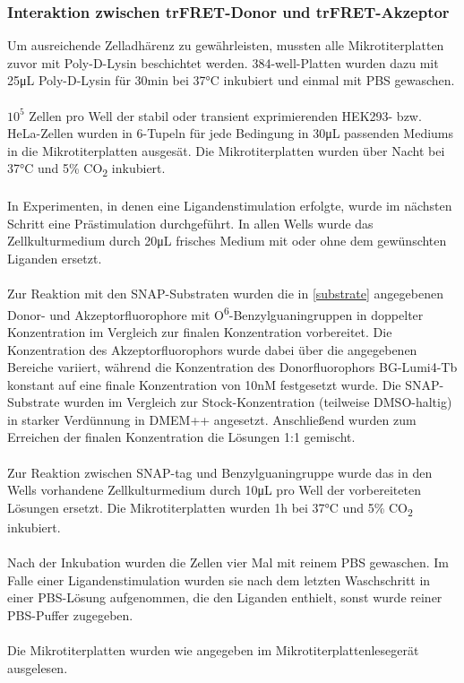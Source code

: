 \subsubsection{Interaktion zwischen trFRET-Donor und trFRET-Akzeptor}\label{interaktion}

Um ausreichende Zelladhärenz zu gewährleisten, mussten alle Mikrotiterplatten zuvor mit Poly-D-Lysin beschichtet werden. 384-well-Platten wurden dazu mit 25\si{\micro\liter} Poly-D-Lysin für 30\si{\minute} bei 37\si{\celsius} inkubiert und einmal mit PBS gewaschen.
\\ \\
$10^5$ Zellen pro Well der stabil oder transient exprimierenden HEK293- bzw. HeLa-Zellen wurden in 6-Tupeln für jede Bedingung in 30\si{\micro\liter} passenden Mediums in die Mikrotiterplatten ausgesät. Die Mikrotiterplatten wurden über Nacht bei 37\si{\celsius} und 5\% CO\textsubscript{2} inkubiert.
\\ \\
In Experimenten, in denen eine Ligandenstimulation erfolgte, wurde im nächsten Schritt eine Prästimulation durchgeführt. In allen Wells wurde das Zellkulturmedium durch 20\si{\micro\liter} frisches Medium mit oder ohne dem gewünschten Liganden ersetzt.
\\ \\
Zur Reaktion mit den SNAP-Substraten wurden die in \ref{substrate} angegebenen Donor- und Akzeptorfluorophore mit O\textsuperscript{6}-Benzylguaningruppen in doppelter Konzentration im Vergleich zur finalen Konzentration vorbereitet. Die Konzentration des Akzeptorfluorophors wurde dabei über die angegebenen Bereiche variiert, während die Konzentration des Donorfluorophors BG-Lumi4-Tb konstant auf eine finale Konzentration von 10\si{\nano M} festgesetzt wurde. Die SNAP-Substrate wurden im Vergleich zur Stock-Konzentration (teilweise DMSO-haltig) in starker Verdünnung in DMEM++ angesetzt. Anschließend wurden zum Erreichen der finalen Konzentration die Lösungen 1:1 gemischt.
\\ \\  
Zur Reaktion zwischen SNAP-tag und Benzylguaningruppe wurde das in den Wells vorhandene Zellkulturmedium durch 10\si{\micro\liter} pro Well der vorbereiteten Lösungen ersetzt. Die Mikrotiterplatten wurden 1\si{\hour} bei 37\si{\celsius} und 5\% CO\textsubscript{2} inkubiert.
\\ \\
Nach der Inkubation wurden die Zellen vier Mal mit reinem PBS gewaschen. Im Falle einer Ligandenstimulation wurden sie nach dem letzten Waschschritt in einer PBS-Lösung aufgenommen, die den Liganden enthielt, sonst wurde reiner PBS-Puffer zugegeben.
\\ \\
Die Mikrotiterplatten wurden wie angegeben im Mikrotiterplattenlesegerät ausgelesen.

